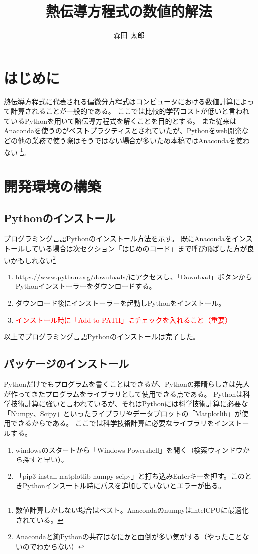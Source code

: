 \documentclass[]{ltjsarticle}
\title{熱伝導方程式の数値的解法}
\author{森田~太郎}
\date{}
\begin{document}
	\maketitle
	\section{はじめに}
	熱伝導方程式に代表される偏微分方程式はコンピュータにおける数値計算によって計算されることが一般的である。
	ここでは比較的学習コストが低いと言われているPythonを用いて熱伝導方程式を解くことを目的とする。
	また従来はAnacondaを使うのがベストプラクティスとされていたが、Pythonをweb開発などの他の業務で使う際はそうではない場合が多いため本稿ではAnacondaを使わない
	\footnote{数値計算しかしない場合はベスト。AnacondaのnumpyはIntelCPUに最適化されている。}。

	\section{開発環境の構築}
	\subsection{Pythonのインストール}
	プログラミング言語Pythonのインストール方法を示す。
	既にAnacondaをインストールしている場合は次セクション「はじめのコード」まで呼び飛ばした方が良いかもしれない\footnote{Anacondaと純Pythonの共存はなにかと面倒が多い気がする（やったことないのでわからない）}
	\begin{enumerate}
		\item \url{https://www.python.org/downloads/}にアクセスし、「Download」ボタンからPythonインストーラーをダウンロードする。
		\item ダウンロード後にインストーラーを起動しPythonをインストール。
		\item \textcolor{red}{インストール時に「Add to PATH」にチェックを入れること（重要）}
	\end{enumerate}
	以上でプログラミング言語Pythonのインストールは完了した。

	\subsection{パッケージのインストール}
	Pythonだけでもプログラムを書くことはできるが、Pythonの素晴らしさは先人が作ってきたプログラムをライブラリとして使用できる点である。
	Pythonは科学技術計算に強いと言われているが、それはPythonには科学技術計算に必要な「Numpy、Scipy」といったライブラリやデータプロットの「Matplotlib」が使用できるからである。
	ここでは科学技術計算に必要なライブラリをインストールする。
	\begin{enumerate}
		\item windowsのスタートから「Windows Powershell」を開く（検索ウィンドウから探すと早い）。
		\item 「pip3 install matplotlib numpy scipy」と打ち込みEnterキーを押す。このときPythonインスートル時にパスを追加していないとエラーが出る。
	\end{enumerate}
\end{document}
